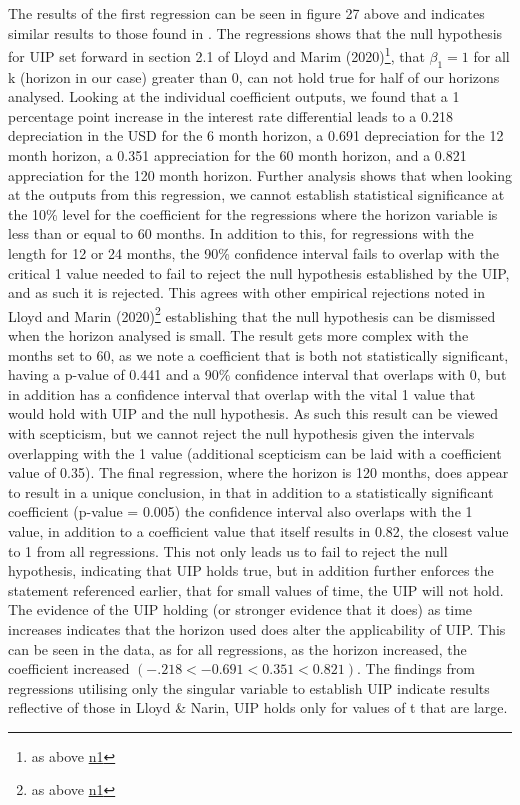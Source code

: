 \documentclass[10pt]{article}
\begin{document}
The results of the first regression can be seen in figure 27 above and indicates similar results to those found in \cite{lloyd2020exchange}. The regressions shows that the null hypothesis for UIP set forward in section 2.1 of Lloyd and Marim (2020)\footnote{as above \hyperref[lloyd2020exchange]{n1}}, that $\beta_1 = 1$ for all k (horizon in our case) greater than 0, can not hold true for half of our horizons analysed. Looking at the individual coefficient outputs, we found that a 1 percentage point increase in the interest rate differential leads to a 0.218 depreciation in the USD for the 6 month horizon, a 0.691 depreciation for the 12 month horizon, a 0.351 appreciation for the 60 month horizon, and a 0.821 appreciation for the 120 month horizon. Further analysis shows that when looking at the outputs from this regression, we cannot establish statistical significance at the 10\% level for the coefficient for the regressions where the horizon variable is less than or equal to 60 months. In addition to this, for regressions with the length for 12 or 24 months, the 90\% confidence interval fails to overlap with the critical 1 value needed to fail to reject the null hypothesis established by the UIP, and as such it is rejected. This agrees with other empirical rejections noted in Lloyd and Marin (2020)\footnote{as above \hyperref[lloyd2020exchange]{n1}} establishing that the null hypothesis can be dismissed when the horizon analysed is small. The result gets more complex with the months set to 60, as we note a coefficient that is both not statistically significant, having a p-value of 0.441 and a 90\% confidence interval that overlaps with 0, but in addition has a confidence interval that overlap with the vital 1 value that would hold with UIP and the null hypothesis. As such this result can be viewed with scepticism, but we cannot reject the null hypothesis given the intervals overlapping with the 1 value (additional scepticism can be laid with a coefficient value of 0.35). The final regression, where the horizon is 120 months, does appear to result in a unique conclusion, in that in addition to a statistically significant coefficient (p-value = 0.005) the confidence interval also overlaps with the 1 value, in addition to a coefficient value that itself results in 0.82, the closest value to 1 from all regressions. This not only leads us to fail to reject the null hypothesis, indicating that UIP holds true, but in addition further enforces the statement referenced earlier, that for small values of time, the UIP will not hold. The evidence of the UIP holding (or stronger evidence that it does) as time increases indicates that the horizon used does alter the applicability of UIP. This can be seen in the data, as for all regressions, as the horizon increased, the coefficient increased $(-.218 < -0.691 < 0.351 < 0.821)$. The findings from regressions utilising only the singular variable to establish UIP indicate results reflective of those in Lloyd \& Narin, UIP holds only for values of t that are large.
\end{document}
